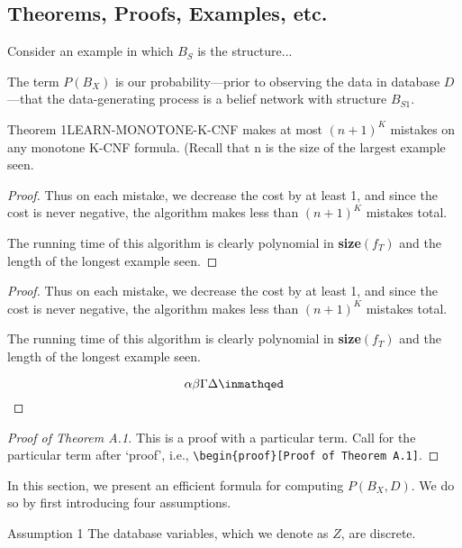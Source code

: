\begin{article}
\section{Theorems, Proofs, Examples, etc.}

\begin{example}
Consider an example in which $B_S$ is the structure...

The term $P(B_X)$ is our probability---prior to observing the data
in database $D$---that the data-generating process is a belief network with
structure $B_{S1}$.
\end{example}


\begin{proclaim}{Theorem 1}LEARN-MONOTONE-K-CNF makes at most
$(n+1)^K$ mistakes on any monotone K-CNF formula. (Recall that
n is the size of the largest example seen.
\end{proclaim}

\begin{proof}
Thus on each mistake, we decrease the cost by at least 1, and since the 
cost is never negative, the algorithm makes less than $(n+1)^K$
mistakes total.

The running time of this algorithm is clearly polynomial in 
{\bf size}$(f_T)$ and the length of the longest example seen.
\end{proof}


\begin{proof}
Thus on each mistake, we decrease the cost by at least 1, and since the 
cost is never negative, the algorithm makes less than $(n+1)^K$
mistakes total.

The running time of this algorithm is clearly polynomial in 
{\bf size}$(f_T)$ and the length of the longest example seen.

\[
\alpha\beta\Gamma\Delta\inmathqed
\]
\end{proof}

\begin{proof}[Proof of Theorem A.1]
This is a proof with a particular term. Call for the
particular term after `proof', i.e., 
\verb+\begin{proof}[Proof of Theorem A.1]+.
\end{proof}


In this section, we present an efficient formula for computing $P(B_X, D)$.
We do so by first introducing four assumptions.

\begin{demo}{Assumption 1}
The database variables, which we denote as $Z$, are discrete.
\end{demo}


\end{article}
